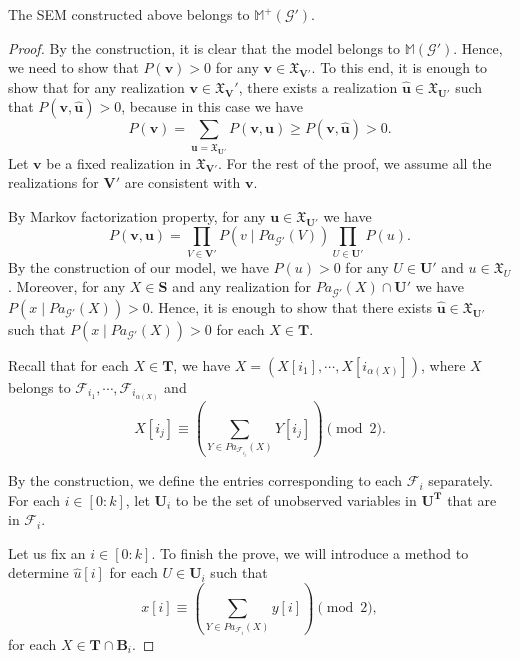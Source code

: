 \documentclass[accepted]{uai2022}
\newenvironment{customlem}[1]{\renewcommand\thelemma{#1}\lemma}{\endlemma}
\newcommand{\Pa}[2]{\textit{Pa}_{#2}(#1)}
\newcommand{\V}[0]{\mathbf{V}}
\newcommand{\U}[0]{\mathbf{U}}
\newcommand{\B}[0]{\mathbf{B}}
\newcommand{\T}[0]{\mathbf{T}}
\newcommand{\G}[0]{\mathcal{G}}
\newcommand{\F}[0]{\mathcal{F}}
\newcommand{\dom}[1]{\mathfrak{X}_{#1}}
\begin{document}
    \begin{customlem}{\ref{lemma: valid model}}
        The SEM constructed above belongs to $\mathbb{M}^+(\G')$. 
    \end{customlem}
    \begin{proof}
        By the construction, it is clear that the model belongs to $\mathbb{M}(\G')$. 
        Hence, we need to show that $P(\mathbf{v})>0$ for any $\mathbf{v}\in \dom{\V'}$. 
        To this end, it is enough to show that for any realization $\mathbf{v} \in \dom{\V}'$, there exists a realization $\hat{\mathbf{u}}\in \dom{\U'}$ such that $P(\mathbf{v}, \hat{\mathbf{u}})>0$, because in this case we have
        \begin{equation*}
            P(\mathbf{v}) = \sum_{\mathbf{u}=\dom{\U'}} P(\mathbf{v,u}) \geq P(\mathbf{v}, \hat{\mathbf{u}}) > 0.
        \end{equation*}
        Let $\mathbf{v}$ be a fixed realization in $\dom{\V'}$. 
        For the rest of the proof, we assume all the realizations for $\V'$ are consistent with $\mathbf{v}$.
        
        By Markov factorization property,  for any $\mathbf{u}\in \dom{\U'}$ we have 
        \begin{equation}
            P(\mathbf{v}, \mathbf{u}) = \prod_{V\in \V'}P(v\mid \Pa{V}{\G'})\prod_{U\in \U'}P(u).
        \end{equation}
        By the construction of our model, we have $P(u)>0$ for any $U\in \U'$ and $u\in \dom{U}$. 
        Moreover, for any $X\in \mathbf{S}$ and any realization for $\Pa{X}{\G'}\cap \U'$ we have $P(x \mid \Pa{X}{\G'})>0$. 
        Hence, it is enough to show that there exists $\hat{\mathbf{u}}\in \dom{\U'}$ such that $P(x \mid \Pa{X}{\G'})>0$ for each $X\in \T$.
        
        Recall that for each $X\in \T$, we have $X=(X[i_1],\cdots, X[i_{\alpha(X)}])$, where $X$ belongs to $\F_{i_1}, \cdots, \F_{i_{\alpha(X)}}$ and 
        \begin{equation*}
            X[i_j] \equiv \left(\sum_{Y \in \Pa{X}{\F_{i_j}}} Y[i_j]\right) \pmod{2}.
        \end{equation*}
        
        By the construction, we define the entries corresponding to each $\F_i$ separately. 
        For each $i\in [0:k]$, let $\U_i$ to be the set of unobserved variables in $\U^{\T}$ that are in $\F_i$. 
        
        Let us fix an $i\in [0:k]$. 
        To finish the prove, we will introduce a method to determine $\hat{u}[i]$ for each $U\in \U_i$ such that 
        \begin{equation} \label{eq: eq for T}
            x[i] \equiv \left(\sum_{Y \in \Pa{X}{\F_{i}}} y[i]\right) \pmod{2},
        \end{equation}
        for each $X\in \T \cap \B_i$. 
        

\end{proof}
\end{document}

